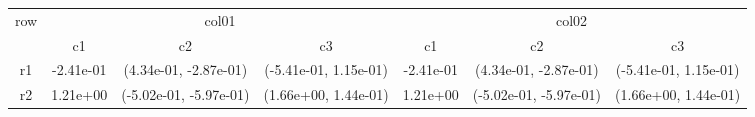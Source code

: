 \begin{tabular}{ccccccc}
\toprule
\multirow{2}{*}{row}&\multicolumn{3}{c}{col01}&\multicolumn{3}{c}{col02}\tabularnewline
\cmidrule(lr){2-4}
\cmidrule(lr){5-7}
&c1&c2&c3&c1&c2&c3\tabularnewline
\midrule
r1&-2.41e-01& (4.34e-01, -2.87e-01)& (-5.41e-01, 1.15e-01)&-2.41e-01& (4.34e-01, -2.87e-01)& (-5.41e-01, 1.15e-01)\tabularnewline
r2&1.21e+00& (-5.02e-01, -5.97e-01)& (1.66e+00, 1.44e-01)&1.21e+00& (-5.02e-01, -5.97e-01)& (1.66e+00, 1.44e-01)\tabularnewline
\bottomrule
\end{tabular}
